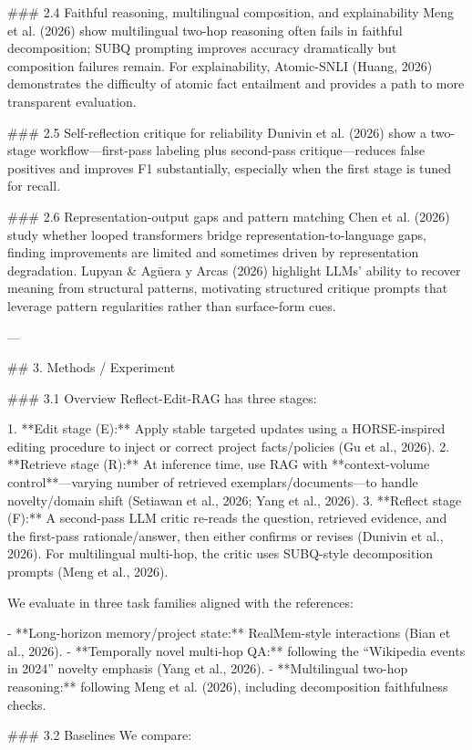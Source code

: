 ### 2.4 Faithful reasoning, multilingual composition, and explainability  
Meng et al. (2026) show multilingual two-hop reasoning often fails in faithful decomposition; SUBQ prompting improves accuracy dramatically but composition failures remain. For explainability, Atomic-SNLI (Huang, 2026) demonstrates the difficulty of atomic fact entailment and provides a path to more transparent evaluation.

### 2.5 Self-reflection critique for reliability  
Dunivin et al. (2026) show a two-stage workflow—first-pass labeling plus second-pass critique—reduces false positives and improves F1 substantially, especially when the first stage is tuned for recall.

### 2.6 Representation-output gaps and pattern matching  
Chen et al. (2026) study whether looped transformers bridge representation-to-language gaps, finding improvements are limited and sometimes driven by representation degradation. Lupyan & Agüera y Arcas (2026) highlight LLMs’ ability to recover meaning from structural patterns, motivating structured critique prompts that leverage pattern regularities rather than surface-form cues.

---

## 3. Methods / Experiment  

### 3.1 Overview  
Reflect-Edit-RAG has three stages:

1. **Edit stage (E):** Apply stable targeted updates using a HORSE-inspired editing procedure to inject or correct project facts/policies (Gu et al., 2026).  
2. **Retrieve stage (R):** At inference time, use RAG with **context-volume control**—varying number of retrieved exemplars/documents—to handle novelty/domain shift (Setiawan et al., 2026; Yang et al., 2026).  
3. **Reflect stage (F):** A second-pass LLM critic re-reads the question, retrieved evidence, and the first-pass rationale/answer, then either confirms or revises (Dunivin et al., 2026). For multilingual multi-hop, the critic uses SUBQ-style decomposition prompts (Meng et al., 2026).

We evaluate in three task families aligned with the references:

- **Long-horizon memory/project state:** RealMem-style interactions (Bian et al., 2026).  
- **Temporally novel multi-hop QA:** following the “Wikipedia events in 2024” novelty emphasis (Yang et al., 2026).  
- **Multilingual two-hop reasoning:** following Meng et al. (2026), including decomposition faithfulness checks.

### 3.2 Baselines  
We compare:

